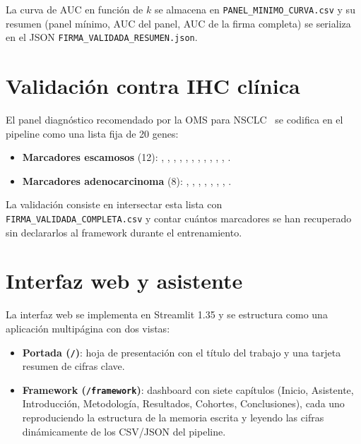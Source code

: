 La curva de AUC en función de $k$ se almacena en
\texttt{PANEL\_MINIMO\_CURVA.csv} y su resumen (panel mínimo, AUC del
panel, AUC de la firma completa) se serializa en el JSON
\texttt{FIRMA\_VALIDADA\_RESUMEN.json}.

\section{Validación contra IHC clínica}
\label{sec:validacion_ihc}

El panel diagnóstico recomendado por la OMS para NSCLC~\cite{travis2015who}
se codifica en el pipeline como una lista fija de 20 genes:

\begin{itemize}
  \item \textbf{Marcadores escamosos} (12): , ,
  , , , , ,
  , , , , .
  \item \textbf{Marcadores adenocarcinoma} (8): ,
  , , , , ,
  , .
\end{itemize}

La validación consiste en intersectar esta lista con
\texttt{FIRMA\_VALIDADA\_COMPLETA.csv} y contar cuántos marcadores se han
recuperado sin declararlos al framework durante el entrenamiento.

\section{Interfaz web y asistente}
\label{sec:interfaz}

La interfaz web se implementa en Streamlit 1.35 y se estructura como una
aplicación multipágina con dos vistas:

\begin{itemize}
  \item \textbf{Portada (\texttt{/})}: hoja de presentación con el título
  del trabajo y una tarjeta resumen de cifras clave.
  \item \textbf{Framework (\texttt{/framework})}: dashboard con siete
  capítulos (Inicio, Asistente, Introducción, Metodología, Resultados,
  Cohortes, Conclusiones), cada uno reproduciendo la estructura de la
  memoria escrita y leyendo las cifras dinámicamente de los CSV/JSON del
  pipeline.
\end{itemize}

